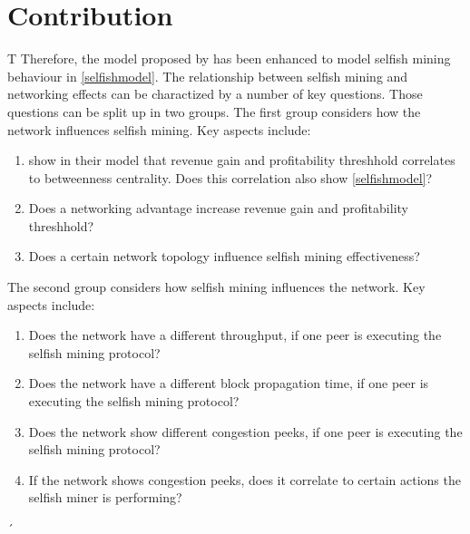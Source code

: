 \chapter{Contribution}\label{chap:contribution}
T
Therefore, the model proposed by \citeauthor{gopalan} has been enhanced to model selfish mining behaviour in \ref{selfishmodel}.
The relationship between selfish mining and networking effects can be charactized by a number of key questions.
Those questions can be split up in two groups.
The first group considers how the network influences selfish mining.
Key aspects include:
\begin{enumerate}
\item \citet{xiao_modeling} show in their model that revenue gain and profitability threshhold correlates to betweenness centrality. Does this correlation also show \ref{selfishmodel}?
\item Does a networking advantage increase revenue gain and profitability threshhold?
\item Does a certain network topology influence selfish mining effectiveness?
\end{enumerate}
The second group considers how selfish mining influences the network.
Key aspects include:
\begin{enumerate}
\item Does the network have a different throughput, if one peer is executing the selfish mining protocol?
\item Does the network have a different block propagation time, if one peer is executing the selfish mining protocol?
\item Does the network show different congestion peeks, if one peer is executing the selfish mining protocol?
\item If the network shows congestion peeks, does it correlate to certain actions the selfish miner is performing?
\end{enumerate}
´







